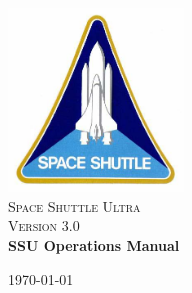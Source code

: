 \documentclass[13pt]{article}
\begin{document}
{}
\begin{titlepage}

\begin{center}

\includegraphics[width=0.35\textwidth]{SSP.jpg}\\[1cm]

\textsc{\LARGE Space Shuttle Ultra}\\[1.5cm]

\textsc{\Large Version 3.0}\\[0.5cm]

\huge \bfseries SSU Operations Manual\\[0.4cm]

\vfill

{\large \today}

\end{center}

\end{titlepage}
\end{document}
